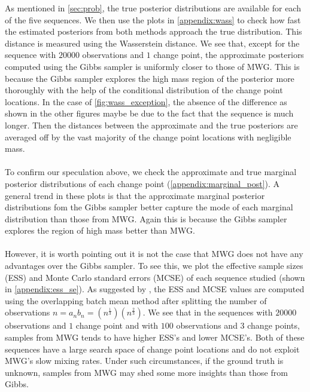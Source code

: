 As mentioned in \cref{sec:prob}, the true posterior distributions are available for each of the five sequences. We then use the plots in \cref{appendix:wass} to check how fast the estimated posteriors from both methods approach the true distribution. This distance is measured using the Wasserstein distance. We see that, except for the sequence with $20000$ observations and $1$ change point, the approximate posteriors computed using the Gibbs sampler is uniformly closer to those of MWG. This is because the Gibbs sampler explores the high mass region of the posterior more thoroughly with the help of the conditional distribution of the change point locations. In the case of \cref{fig:wass_exception}, the absence of the difference as shown in the other figures maybe be due to the fact that the sequence is much longer. Then the distances between the approximate and the true posteriors are averaged off by the vast majority of the change point locations with negligible mass.\\\\
To confirm our speculation above, we check the approximate and true marginal posterior distributions of each change point (\cref{appendix:marginal_post}). A general trend in these plots is that the approximate marginal posterior distributions fom the Gibbs sampler better capture the mode of each marginal distribution than those from MWG. Again this is because the Gibbs sampler explores the region of high mass better than MWG.\\\\
However, it is worth pointing out it is not the case that MWG does not have any advantages over the Gibbs sampler. To see this, we plot the effective sample sizes (ESS) and Monte Carlo standard errors (MCSE) of each sequence studied (shown in \cref{appendix:ess_se}). As suggested by \cite{flegal2010batch}, the ESS and MCSE values are computed using the overlapping batch mean method after splitting the number of observations $n = a_nb_n = \left(n^{\frac{1}{3}}\right)\left(n^{\frac{2}{3}}\right)$. We see that in the sequences with $20000$ observations and $1$ change point and with $100$ observations and $3$ change points, samples from MWG tends to have higher ESS's and lower MCSE's. Both of these sequences have a large search space of change point locations and do not exploit MWG's slow mixing rates. Under such circumstances, if the ground truth is unknown, samples from MWG may shed some more insights than those from Gibbs.
